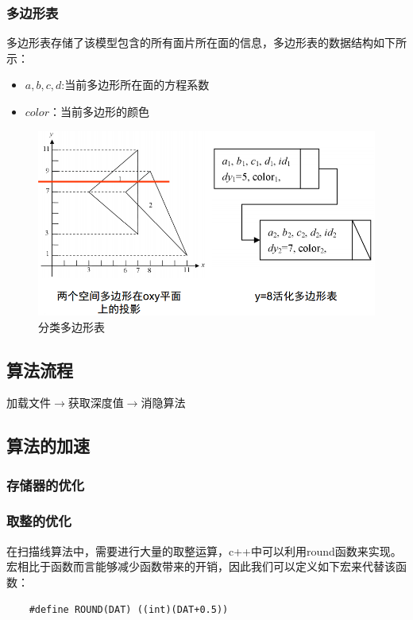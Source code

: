 \documentclass[10pt]{article}
\begin{document}
\subsubsection{多边形表}
多边形表存储了该模型包含的所有面片所在面的信息，多边形表的数据结构如下所示：
\begin{itemize}
\item{$a,b,c,d$:当前多边形所在面的方程系数}
\item{$color$：当前多边形的颜色}
\end{itemize}
\begin{figure}[H]
\setlength{\abovecaptionskip}{2pt}
\begin{center}
\includegraphics[scale=0.4]{structure1.png}
\end{center}
\caption{分类多边形表}
\end{figure}

\subsection{算法流程}
加载文件$\to$获取深度值$\to$消隐算法


\subsection{算法的加速}
\subsubsection{存储器的优化}

\subsubsection{取整的优化}
在扫描线算法中，需要进行大量的取整运算，c++中可以利用round函数来实现。宏相比于函数而言能够减少函数带来的开销，因此我们可以定义如下宏来代替该函数：
\begin{lstlisting}
	#define ROUND(DAT) ((int)(DAT+0.5))
\end{lstlisting}
\end{document}
